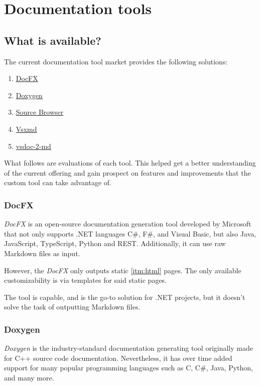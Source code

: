 \chapter{Documentation tools}
\section{What is available?}
The current documentation tool market provides the following solutions:

\begin{enumerate}
    \item \href{https://github.com/dotnet/docfx}{DocFX}
    \item \href{https://www.doxygen.nl/}{Doxygen}
    \item \href{https://github.com/KirillOsenkov/SourceBrowser}{Source Browser}
    \item \href{https://github.com/lijunle/Vsxmd}{Vsxmd}
    \item \href{https://github.com/discosultan/vsdoc-2-md}{vsdoc-2-md}
\end{enumerate}

What follows are evaluations of each tool. This helped get a better understanding of the current offering and gain prospect on features and improvements that the custom tool can take advantage of.

\subsection{DocFX}

\textit{DocFX} is an open-source documentation generation tool developed by Microsoft that not only supports .NET languages C\#, F\#, and Visual Basic, but also Java, JavaScript, TypeScript, Python and REST. Additionally, it can use raw Markdown files as input.

However, the \textit{DocFX} only outputs static \ref{itm:html} pages. The only available customizability is via templates for said static pages.

The tool is capable, and is the go-to solution for .NET projects, but it doesn't solve the task of outputting Markdown files.

\subsection{Doxygen}

\textit{Doxygen} is the industry-standard documentation generating tool originally made for C++ source code documentation. Nevertheless, it has over time added support for many popular programming languages such as C, C\#, Java, Python, and many more.

